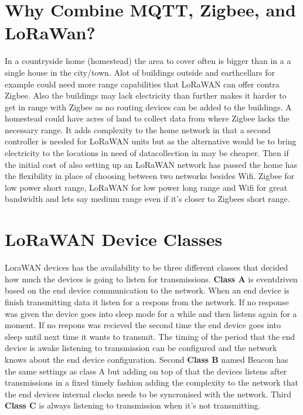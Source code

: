 \documentclass[article,a4paper]{IEEEtran}
\begin{document}
    \section{Why Combine MQTT, Zigbee, and LoRaWan?}
    In a countryside home (homestead) the area to cover often is bigger than in a a single house in the city/town. Alot of buildings outside and earthcellars for example could need more range capabilities that LoRaWAN can offer contra Zigbee. Also the buildings may lack electricity than further makes it harder to get in range with Zigbee as no routing devices can be added to the buildings. A homestead could have acres of land to collect data from where Zigbee lacks the necessary range. It adds complexity to the home network in that a second controller is needed for LoRaWAN units but as the alternative would be to bring electricity to the locations in need of datacollection in may be cheaper. Then if the initial cost of also setting up an LoRaWAN network has passed the home has the flexibility in place of choosing between two networks besides Wifi. Zigbee for low power short range, LoRaWAN for low power long range and Wifi for great bandwidth and lets say medium range even if it's closer to Zigbees short range. 
    \section{LoRaWAN Device Classes}
    LoraWAN devices has the availability to be three different classes that decided how much the devices is going to listen for transmissions. \textbf{Class A} is eventdriven based on the end device communication to the network. When an end device is finish transmitting data it listen for a respons from the network. If no response was given the device goes into sleep mode for a while and then listens again for a moment. If no respons was recieved the second time the end device goes into sleep until next time it wants to transmit. The timing of the period that the end device is awake listening to transmission can be configured and the network knows about the end device configuration. Second \textbf{Class B} named Beacon has the same settings as class A but adding on top of that the devices listens after transmissions in a fixed timely fashion adding the complexity to the network that the end devices internal clocks needs to be syncronised with the network. Third \textbf{Class C} is always listening to transmission when it's not transmitting. 
\end{document}
